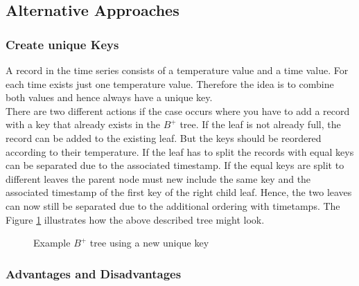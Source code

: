 \documentclass[abstracton,12pt]{scrreprt}
\begin{document}
\subsection{Alternative Approaches}


\subsubsection{Create unique Keys}
A record in the time series consists of a temperature value and a time value. For each time exists just one temperature value. Therefore the idea is to combine both values and hence always have a unique key. \\
There are two different actions if the case occurs where you have to add a record with a key that already exists in the $B^+$ tree. If the leaf is not already full, the record can be added to the existing leaf. But the keys should be reordered according to their temperature. If the leaf has to split the records with equal keys can be separated due to the associated timestamp. If the equal keys are split to different leaves the parent node must new include the same key and the associated timestamp of the first key of the right child leaf. Hence, the two leaves can now still be separated due to the additional ordering with timetamps. The Figure \ref{fig:keyT} illustrates how the above described tree might look. 
\begin{figure}[H]
	\centering
	\vspace{2mm}
	\caption{Example $B^+$ tree using a new unique key}
	\label{fig:keyT}
	
\end{figure}		

\subsubsection{Advantages and Disadvantages}
\end{document}
